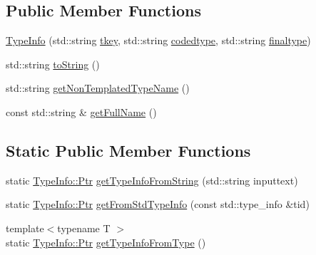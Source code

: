 \subsection*{Public Member Functions}
\begin{DoxyCompactItemize}
\item 
\hyperlink{classsmacc_1_1introspection_1_1TypeInfo_ae57986b3f7e913346a379ec7ad609ffc}{Type\+Info} (std\+::string \hyperlink{classsmacc_1_1introspection_1_1TypeInfo_a697dd505119258dba1224d10eea5b2bd}{tkey}, std\+::string \hyperlink{classsmacc_1_1introspection_1_1TypeInfo_a117d2b73994b78a6e4e81cdf7054912c}{codedtype}, std\+::string \hyperlink{classsmacc_1_1introspection_1_1TypeInfo_aa4010ed427e12db443e08ab16a3de243}{finaltype})
\item 
std\+::string \hyperlink{classsmacc_1_1introspection_1_1TypeInfo_a41eb6c64f46a8e24a206e5702c6f6818}{to\+String} ()
\item 
std\+::string \hyperlink{classsmacc_1_1introspection_1_1TypeInfo_adf059b6105291f4d6402068e8b122365}{get\+Non\+Templated\+Type\+Name} ()
\item 
const std\+::string \& \hyperlink{classsmacc_1_1introspection_1_1TypeInfo_ad00815e2537a11be93c9a80846f4dc3a}{get\+Full\+Name} ()
\end{DoxyCompactItemize}
\subsection*{Static Public Member Functions}
\begin{DoxyCompactItemize}
\item 
static \hyperlink{classsmacc_1_1introspection_1_1TypeInfo_aa6ffd9c39811d59f7c771941b7fad860}{Type\+Info\+::\+Ptr} \hyperlink{classsmacc_1_1introspection_1_1TypeInfo_a47d65b6c61499d7ae8ab9f6325c84837}{get\+Type\+Info\+From\+String} (std\+::string inputtext)
\item 
static \hyperlink{classsmacc_1_1introspection_1_1TypeInfo_aa6ffd9c39811d59f7c771941b7fad860}{Type\+Info\+::\+Ptr} \hyperlink{classsmacc_1_1introspection_1_1TypeInfo_ada1e604cd8bf968a5f816fbace4af881}{get\+From\+Std\+Type\+Info} (const std\+::type\+\_\+info \&tid)
\item 
{\footnotesize template$<$typename T $>$ }\\static \hyperlink{classsmacc_1_1introspection_1_1TypeInfo_aa6ffd9c39811d59f7c771941b7fad860}{Type\+Info\+::\+Ptr} \hyperlink{classsmacc_1_1introspection_1_1TypeInfo_a8716ca6ac890b4582986d9fe4f5962ad}{get\+Type\+Info\+From\+Type} ()
\end{DoxyCompactItemize}
